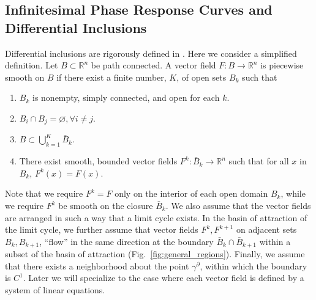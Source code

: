 \documentclass[12pt]{article}
\begin{document}
\subsection{Infinitesimal Phase Response Curves and Differential Inclusions}\label{sec:iprcs_and_dis}
Differential inclusions are rigorously defined in \cite{Filipov1988}.  Here we consider a simplified definition. Let $B \subset \mathbb{R}^n$ be path connected.  A vector field $F:B \rightarrow \mathbb{R}^n$ is piecewise smooth on $B$ if there exist a finite number, $K$, of open sets $B_k$ such that
  \begin{enumerate}
    \item $B_k$ is nonempty, simply connected, and open for each $k$.
    \item $B_i \cap B_j = \varnothing, \forall i \neq j$.
    \item $B \subset \bigcup_{k=1}^K \bar{B}_k$.
    \item There exist smooth, bounded vector fields $F^k: \bar{B}_k \rightarrow \mathbb{R}^n$ such that for all $x$ in $B_k$, $F^k(x)=F(x)$.
  \end{enumerate}
  Note that we require $F^k=F$ only on the interior of each open domain $B_k$, while we require $F^k$ be smooth on the closure $\bar{B}_k$.  We also assume that the vector fields are arranged in such a way that a limit cycle exists.  In the basin of attraction of the limit cycle, we further assume that vector fields $F^k, F^{k+1}$ on adjacent sets $B_k,B_{k+1}$,  ``flow'' in the same direction at the boundary $\bar{B}_k \cap \bar{B}_{k+1}$ within a subset of the basin of attraction (Fig.~\ref{fig:general_regions}).  Finally, we assume that there exists a neighborhood about the point $\gamma^\partial$, within which the boundary is $C^1$.  Later we will specialize to the case where each vector field is defined by a system of linear equations.
   
\end{document}

